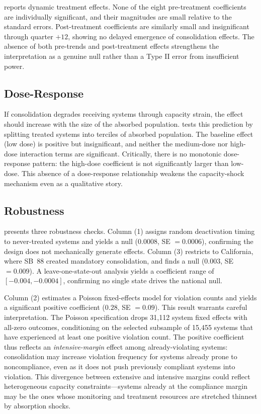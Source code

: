\documentclass[12pt]{article}
\begin{document}


 reports dynamic treatment effects. None of the eight pre-treatment coefficients are individually significant, and their magnitudes are small relative to the standard errors. Post-treatment coefficients are similarly small and insignificant through quarter $+12$, showing no delayed emergence of consolidation effects. The absence of both pre-trends and post-treatment effects strengthens the interpretation as a genuine null rather than a Type II error from insufficient power.

\subsection{Dose-Response}



If consolidation degrades receiving systems through capacity strain, the effect should increase with the size of the absorbed population.  tests this prediction by splitting treated systems into terciles of absorbed population. The baseline effect (low dose) is positive but insignificant, and neither the medium-dose nor high-dose interaction terms are significant. Critically, there is no monotonic dose-response pattern: the high-dose coefficient is not significantly larger than low-dose. This absence of a dose-response relationship weakens the capacity-shock mechanism even as a qualitative story.

\subsection{Robustness}



 presents three robustness checks. Column (1) assigns random deactivation timing to never-treated systems and yields a null ($0.0008$, SE $= 0.0006$), confirming the design does not mechanically generate effects. Column (3) restricts to California, where SB~88 created mandatory consolidation, and finds a null ($0.003$, SE $= 0.009$). A leave-one-state-out analysis yields a coefficient range of $[-0.004, -0.0004]$, confirming no single state drives the national null.

Column (2) estimates a Poisson fixed-effects model for violation counts and yields a significant positive coefficient ($0.28$, SE $= 0.09$). This result warrants careful interpretation. The Poisson specification drops 31,112 system fixed effects with all-zero outcomes, conditioning on the selected subsample of 15,455 systems that have experienced at least one positive violation count. The positive coefficient thus reflects an \textit{intensive-margin} effect among already-violating systems: consolidation may increase violation frequency for systems already prone to noncompliance, even as it does not push previously compliant systems into violation. This divergence between extensive and intensive margins could reflect heterogeneous capacity constraints---systems already at the compliance margin may be the ones whose monitoring and treatment resources are stretched thinnest by absorption shocks.
\end{document}
